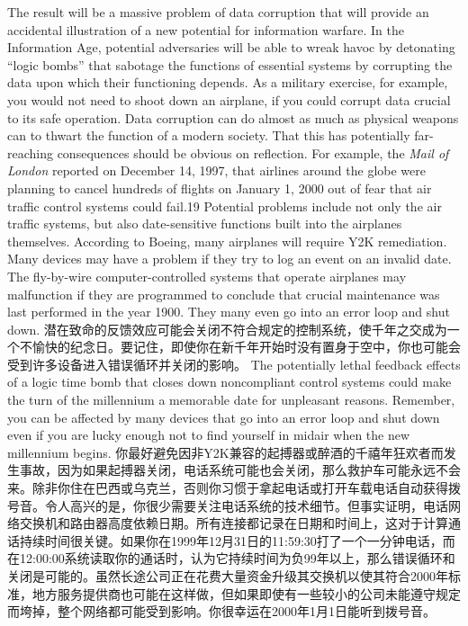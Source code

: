 \begin{paracol}{2}
\switchcolumn
The result will be a massive problem of data corruption that will provide an accidental illustration of a new potential for information warfare. In the Information Age, potential adversaries will be able to wreak havoc by detonating ``logic bombs'' that sabotage the functions of essential systems by corrupting the data upon which their functioning depends. As a military exercise, for example, you would not need to shoot down an airplane, if you could corrupt data crucial to its safe operation. Data corruption can do almost as much as physical weapons can to thwart the function of a modern society. That this has potentially far-reaching consequences should be obvious on reflection. For example, the \emph{Mail of London} reported on December 14, 1997, that airlines around the globe were planning to cancel hundreds of flights on January 1, 2000 out of fear that air traffic control systems could fail.19 Potential problems include not only the air traffic systems, but also date-sensitive functions built into the airplanes themselves. According to Boeing, many airplanes will require Y2K remediation. Many devices may have a problem if they try to log an event on an invalid date. The fly-by-wire computer-controlled systems that operate airplanes may malfunction if they are programmed to conclude that crucial maintenance was last performed in the year 1900. They many even go into an error loop and shut down.
\switchcolumn*
潜在致命的反馈效应可能会关闭不符合规定的控制系统，使千年之交成为一个不愉快的纪念日。要记住，即使你在新千年开始时没有置身于空中，你也可能会受到许多设备进入错误循环并关闭的影响。
\switchcolumn
The potentially lethal feedback effects of a logic time bomb that closes down noncompliant control systems could make the turn of the millennium a memorable date for unpleasant reasons. Remember, you can be affected by many devices that go into an error loop and shut down even if you are lucky enough not to find yourself in midair when the new millennium begins.
\switchcolumn*
你最好避免因非Y2K兼容的起搏器或醉酒的千禧年狂欢者而发生事故，因为如果起搏器关闭，电话系统可能也会关闭，那么救护车可能永远不会来。除非你住在巴西或乌克兰，否则你习惯于拿起电话或打开车载电话自动获得拨号音。令人高兴的是，你很少需要关注电话系统的技术细节。但事实证明，电话网络交换机和路由器高度依赖日期。所有连接都记录在日期和时间上，这对于计算通话持续时间很关键。如果你在1999年12月31日的11:59:30打了一个一分钟电话，而在12:00:00系统读取你的通话时，认为它持续时间为负99年以上，那么错误循环和关闭是可能的。虽然长途公司正在花费大量资金升级其交换机以使其符合2000年标准，地方服务提供商也可能在这样做，但如果即使有一些较小的公司未能遵守规定而垮掉，整个网络都可能受到影响。你很幸运在2000年1月1日能听到拨号音。

\end{paracol}
